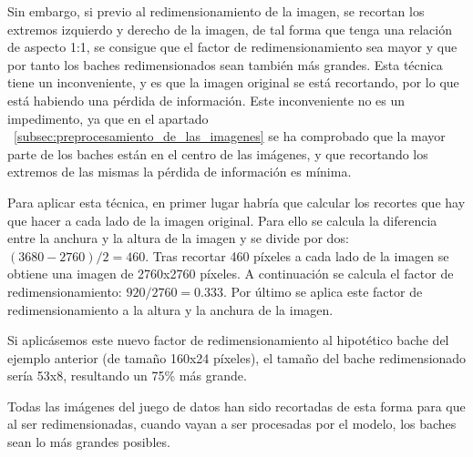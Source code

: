 Sin embargo, si previo al redimensionamiento de la imagen, se recortan los extremos izquierdo y derecho de la imagen, de tal forma que tenga una relación de aspecto 1:1, se consigue que el factor de redimensionamiento sea mayor y que por tanto los baches redimensionados sean también más grandes. Esta técnica tiene un inconveniente, y es que la imagen original se está recortando, por lo que está habiendo una pérdida de información. Este inconveniente no es un impedimento, ya que en el apartado ~\ref{subsec:preprocesamiento_de_las_imagenes} se ha comprobado que la mayor parte de los baches están en el centro de las imágenes, y que recortando los extremos de las mismas la pérdida de información es mínima.

Para aplicar esta técnica, en primer lugar habría que calcular los recortes que hay que hacer a cada lado de la imagen original. Para ello se calcula la diferencia entre la anchura y la altura de la imagen y se divide por dos: $(3680 - 2760) / 2 = 460$. Tras recortar 460 píxeles a cada lado de la imagen se obtiene una imagen de 2760x2760 píxeles. A continuación se calcula el factor de redimensionamiento: $920 / 2760 = 0.333$. Por último se aplica este factor de redimensionamiento a la altura y la anchura de la imagen.

Si aplicásemos este nuevo factor de redimensionamiento al hipotético bache del ejemplo anterior (de tamaño 160x24 píxeles), el tamaño del bache redimensionado sería 53x8, resultando un 75\% más grande.

Todas las imágenes del juego de datos han sido recortadas de esta forma para que al ser redimensionadas, cuando vayan a ser procesadas por el modelo, los baches sean lo más grandes posibles.